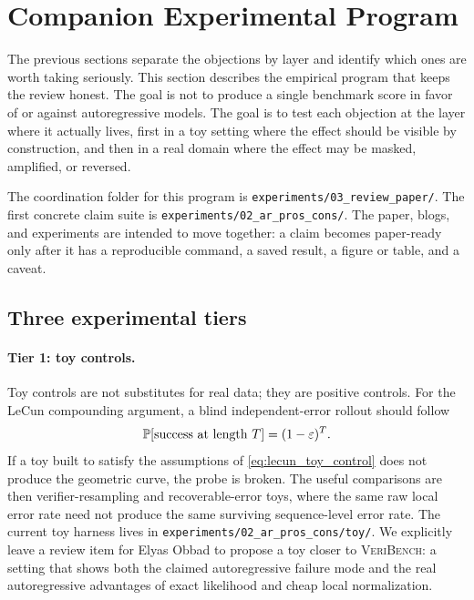 
\section{Companion Experimental Program}
\label{sec:experimental_program}

The previous sections separate the objections by layer and identify which ones are worth taking seriously.
This section describes the empirical program that keeps the review honest.
The goal is not to produce a single benchmark score in favor of or against autoregressive models.
The goal is to test each objection at the layer where it actually lives, first in a toy setting where the effect should be visible by construction, and then in a real domain where the effect may be masked, amplified, or reversed.

The coordination folder for this program is \texttt{experiments/03\_review\_paper/}.
The first concrete claim suite is \texttt{experiments/02\_ar\_pros\_cons/}.
The paper, blogs, and experiments are intended to move together: a claim becomes paper-ready only after it has a reproducible command, a saved result, a figure or table, and a caveat.

\subsection{Three experimental tiers}
\label{ssec:three_tiers}

\paragraph{Tier 1: toy controls.}
Toy controls are not substitutes for real data; they are positive controls.
For the LeCun compounding argument, a blind independent-error rollout should follow
\begin{equation}
  \mathbb{P}[\text{success at length } T] = (1-\varepsilon)^T.
  \label{eq:lecun_toy_control}
\end{equation}
If a toy built to satisfy the assumptions of \cref{eq:lecun_toy_control} does not produce the geometric curve, the probe is broken.
The useful comparisons are then verifier-resampling and recoverable-error toys, where the same raw local error rate need not produce the same surviving sequence-level error rate.
The current toy harness lives in \texttt{experiments/02\_ar\_pros\_cons/toy/}.
We explicitly leave a review item for Elyas Obbad to propose a toy closer to \textsc{VeriBench}: a setting that shows both the claimed autoregressive failure mode and the real autoregressive advantages of exact likelihood and cheap local normalization.

